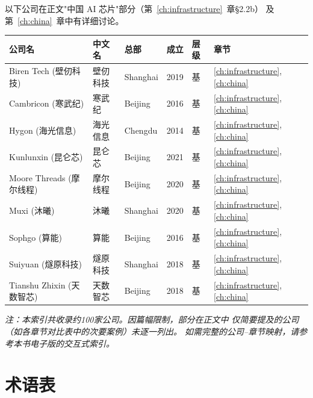 \bigskip

\nopagebreak

\smallskip

以下公司在正文"中国 AI 芯片"部分（第~\ref{ch:infrastructure}~章§2.2b）
及第~\ref{ch:china}~章中有详细讨论。

\begin{tabularx}{\textwidth}{@{}l X l l l l@{}}
\toprule
\rowcolor{figLightGray}
\textbf{公司名} & \textbf{中文名} & \textbf{总部} & \textbf{成立} & \textbf{层级} & \textbf{章节} \\
\midrule
Biren Tech (壁仞科技)     & 壁仞科技   & Shanghai & 2019 & 基 & \ref{ch:infrastructure}, \ref{ch:china} \\
Cambricon (寒武纪)        & 寒武纪     & Beijing  & 2016 & 基 & \ref{ch:infrastructure}, \ref{ch:china} \\
Hygon (海光信息)          & 海光信息   & Chengdu  & 2014 & 基 & \ref{ch:infrastructure}, \ref{ch:china} \\
Kunlunxin (昆仑芯)        & 昆仑芯     & Beijing  & 2021 & 基 & \ref{ch:infrastructure}, \ref{ch:china} \\
Moore Threads (摩尔线程)   & 摩尔线程   & Beijing  & 2020 & 基 & \ref{ch:infrastructure}, \ref{ch:china} \\
Muxi (沐曦)               & 沐曦       & Shanghai & 2020 & 基 & \ref{ch:infrastructure}, \ref{ch:china} \\
Sophgo (算能)             & 算能       & Beijing  & 2016 & 基 & \ref{ch:infrastructure}, \ref{ch:china} \\
Suiyuan (燧原科技)        & 燧原科技   & Shanghai & 2018 & 基 & \ref{ch:infrastructure}, \ref{ch:china} \\
Tianshu Zhixin (天数智芯)  & 天数智芯   & Beijing  & 2018 & 基 & \ref{ch:infrastructure}, \ref{ch:china} \\
\bottomrule
\end{tabularx}

\medskip

\noindent\textit{注：本索引共收录约100家公司。因篇幅限制，部分在正文中
仅简要提及的公司（如各章节对比表中的次要案例）未逐一列出。
如需完整的公司--章节映射，请参考本书电子版的交互式索引。}


\clearpage
\section{术语表}
\label{sec:appendix-glossary}

